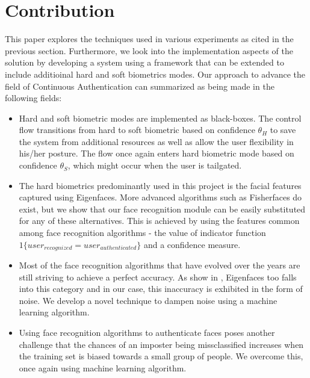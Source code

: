 \documentclass[%
        final,
        internal,
        notitlepage,
        narroweqnarray,
        inline,
        ]{ieee}
\begin{document}
\section{Contribution} \label{sec:contribution}
This paper explores the techniques used in various experiments as cited in the previous section.
Furthermore, we look into the implementation aspects of the solution by developing a system using a framework that can be extended to include additioinal hard and soft biometrics modes. 
Our approach to advance the field of Continuous Authentication can summarized as being made in the following fields:
\begin{itemize}
	\item Hard and soft biometric modes are implemented as black-boxes. The control flow transitions from hard to soft biometric based on confidence $\theta_{H}$ to save the system from additional resources as well as allow the user flexibility in his/her posture. The flow once again enters hard biometric mode based on confidence $\theta_{S}$, which might occur when the user is tailgated.
	\item The hard biometrics predominantly used in this project is the facial features captured using Eigenfaces\cite{Turk91}. More advanced algorithms such as Fisherfaces do exist, but we show that our face recognition module can be easily substituted for any of these alternatives. This is achieved by using the features common among face recognition algorithms - the value of indicator function $1\{user_{recognized}=user_{authenticated}\}$ and a confidence measure.
	\item Most of the face recognition algorithms that have evolved over the years are still striving to achieve a perfect accuracy. As show in \cite{fig:no_svm}, Eigenfaces too falls into this category and in our case, this inaccuracy is exhibited in the form of noise. We develop a novel technique to dampen noise using a machine learning algorithm.
	\item Using face recognition algorithms to authenticate faces poses another challenge that the chances of an imposter being missclassified increases when the training set is biased towards a small group of people. We overcome this, once again using machine learning algorithm.
\end{itemize}


\end{document}
